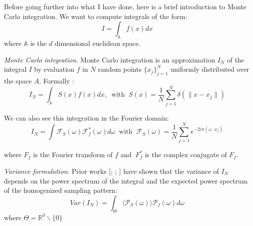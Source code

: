 \documentclass{classeENS}
\begin{document}
Before going further into what I have done, here is a brief 
introduction to Monte Carlo integration. We want to compute integrals of 
the form:
    \[ I = \int_{\mathbb A} f(x) dx\]
where $\mathbb A$ is the $d$ dimensional euclidean space.

\> \textit{Monte Carlo integration}. Monte Carlo integration is an approximation
    $I_N$ of the integral $I$ by evaluation $f$ in $N$ random points $\{x_j\}_{j=1}^N$ uniformly 
    distributed over the space $A$. Formally :
    \[ I_N = \int_{\mathbb A} S(x)f(x)dx, 
        \: \text{ with } \:
    S(x) = \frac{1}{N} \sum_{j=1}^N \delta(\lVert x-x_j \rVert) \] 

\noindent We can also see this integration in the Fourier domain:
\[I_N = \int \mathcal F_S(\omega) \mathcal F_f^*(\omega) d\omega 
    \: \text{ with } \:
    \mathcal F_S(\omega) = \frac{1}{N} \sum_{j=1}^N e^{-2i\pi(\omega\cdot x_j)} \]

    \noindent where $F_f$ is the Fourier transform of $f$ and $\ F_f^*$ is the 
    complex conjugate of $F_f$.

\> \textit{Variance formulation}. Prior works [\cite{Durand2011AFA}; \cite{Pilleboue:2015:VAMCI}; \cite{10.1145/2461912.2462013}] 
    have shown that the variance of $I_N$ depends on the power spectrum of the integral 
    and the expected power spectrum of the homogenized sampling pattern:
    \[ Var(I_N) = \int_\Theta \langle \mathcal P_S(\omega)\rangle \mathcal P_f(\omega) d\omega \]
    \noindent where $\Theta = \mathbb R^d\backslash\{0\} $

    
    
\end{document}
